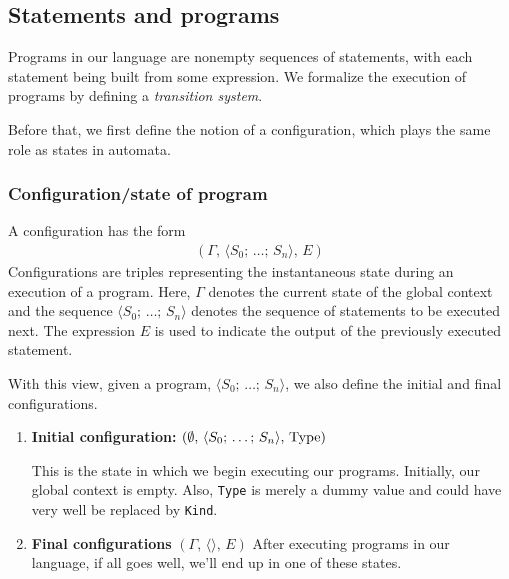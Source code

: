 \documentclass{article}
\begin{document}

\subsection{Statements and programs}
\begin{comment}
  Follows this approach:
  https://www.cs.cornell.edu/courses/cs6110/2013sp/lectures/lec05-sp13.pdf
\end{comment}

Programs in our language are nonempty sequences of statements, with each
statement being built from some expression.
We formalize the execution of programs by defining a
\textit{transition system}.

Before that, we first define the notion of a configuration, which plays the
same role as states in automata. 

\subsubsection{Configuration/state of program}
A configuration has the form
\begin{align*}
  (\Gamma, \, \langle S_0; \, \dots; \, S_n \rangle, \, E)
\end{align*}
Configurations are triples representing the instantaneous state during an
execution of a program. Here, $\Gamma$ denotes the current state of the
global context and the sequence $\langle S_0; \, \dots; \, S_n \rangle$ denotes
the sequence of statements to be executed next. 
The expression $E$ is used to indicate the output of the previously executed
statement.

With this view, given a program, $\langle S_0; \, \dots; \, S_n
\rangle$, we also define the initial and final configurations.
\begin{enumerate}
\item \textbf{Initial configuration:}
  $ (\emptyset, \, \langle S_0; \, \dots; \, S_n \rangle, \, \operatorname{Type})$

  This is the state in which we begin executing our programs.
  Initially, our global context is empty. Also, \verb|Type| is merely a dummy
  value and could have very well be replaced by \verb|Kind|.

\item \textbf{Final configurations} $(\Gamma, \, \langle \rangle, \, E)$
After executing programs in our language, if all goes well, we'll end up in
one of these states.
\end{enumerate}
\end{document}
